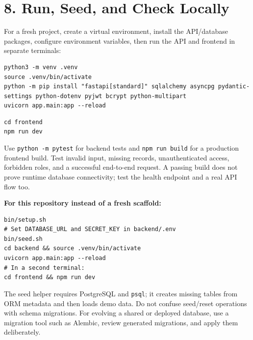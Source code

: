 \documentclass[10pt]{article}
\begin{document}
\section{8. Run, Seed, and Check Locally}
For a fresh project, create a virtual environment, install the API/database packages, configure environment variables, then run the API and frontend in separate terminals:
\begin{lstlisting}
python3 -m venv .venv
source .venv/bin/activate
python -m pip install "fastapi[standard]" sqlalchemy asyncpg pydantic-settings python-dotenv pyjwt bcrypt python-multipart
uvicorn app.main:app --reload
\end{lstlisting}
\begin{lstlisting}
cd frontend
npm run dev
\end{lstlisting}
Use \texttt{python -m pytest} for backend tests and \texttt{npm run build} for a production frontend build. Test invalid input, missing records, unauthenticated access, forbidden roles, and a successful end-to-end request. A passing build does not prove runtime database connectivity; test the health endpoint and a real API flow too.

\textbf{For this repository instead of a fresh scaffold:}
\begin{lstlisting}
bin/setup.sh
# Set DATABASE_URL and SECRET_KEY in backend/.env
bin/seed.sh
cd backend && source .venv/bin/activate
uvicorn app.main:app --reload
# In a second terminal:
cd frontend && npm run dev
\end{lstlisting}
The seed helper requires PostgreSQL and \texttt{psql}; it creates missing tables from ORM metadata and then loads demo data. Do not confuse seed/reset operations with schema migrations. For evolving a shared or deployed database, use a migration tool such as Alembic, review generated migrations, and apply them deliberately.
\end{document}
